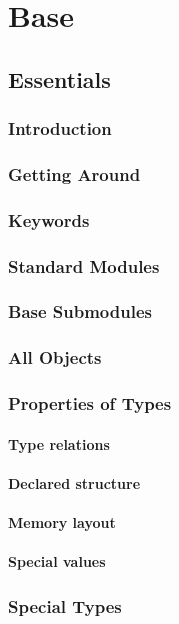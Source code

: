 \part{Base}
\chapter{Essentials}
    \section{Introduction}
    \section{Getting Around}
    \section{Keywords}
    \section{Standard Modules}
    \section{Base Submodules}
    \section{All Objects}
    \section{Properties of Types}
    \subsection{Type relations}
    \subsection{Declared structure}
    \subsection{Memory layout}
    \subsection{Special values}
    \section{Special Types}
